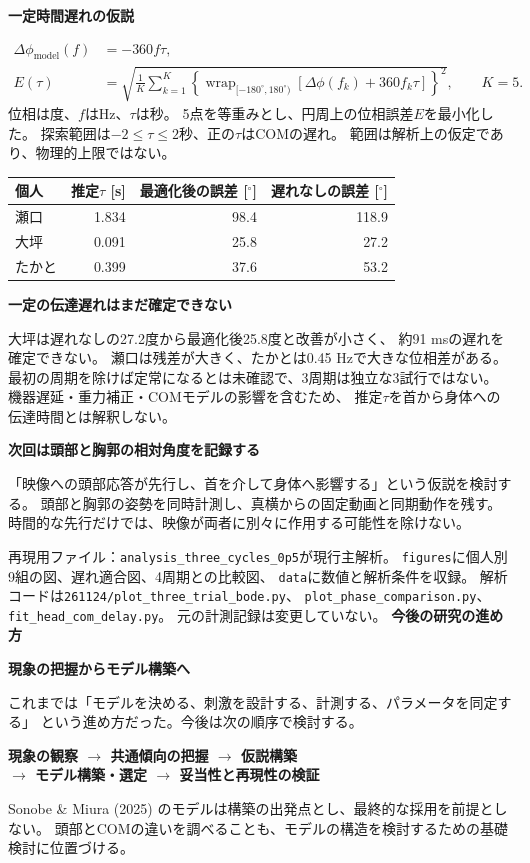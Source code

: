 \documentclass[a4paper,10pt]{ltjsarticle}
\newcommand{\wrap}{\operatorname{wrap}_{[-180^\circ,180^\circ)}}
\newcommand{\sect}[1]{\vspace{4pt}\textbf{\large #1}\par}
\begin{document}
\sect{一定時間遅れの仮説}
\begin{align}
 \Delta\phi_{\mathrm{model}}(f)&=-360f\tau,\\
 E(\tau)&=\sqrt{\frac1K\sum_{k=1}^{K}
 \left\{\wrap\!\left[\Delta\phi(f_k)+360f_k\tau\right]\right\}^{2}},
 \qquad K=5.
\end{align}
位相は度、\(f\)はHz、\(\tau\)は秒。
5点を等重みとし、円周上の位相誤差\(E\)を最小化した。
探索範囲は\(-2\leq\tau\leq2\)秒、正の\(\tau\)はCOMの遅れ。
範囲は解析上の仮定であり、物理的上限ではない。

\begin{center}
\renewcommand{\arraystretch}{1.35}
\begin{tabular}{lrrr}
\toprule
個人 & 推定\(\tau\) [s] & 最適化後の誤差 [$^\circ$] & 遅れなしの誤差 [$^\circ$]\\
\midrule
瀬口 & 1.834 & 98.4 & 118.9\\
大坪 & 0.091 & 25.8 & 27.2\\
たかと & 0.399 & 37.6 & 53.2\\
\bottomrule
\end{tabular}
\end{center}

\sect{一定の伝達遅れはまだ確定できない}
大坪は遅れなしの27.2度から最適化後25.8度と改善が小さく、
約91 msの遅れを確定できない。
瀬口は残差が大きく、たかとは0.45 Hzで大きな位相差がある。
最初の周期を除けば定常になるとは未確認で、3周期は独立な3試行ではない。
機器遅延・重力補正・COMモデルの影響を含むため、
推定\(\tau\)を首から身体への伝達時間とは解釈しない。

\sect{次回は頭部と胸郭の相対角度を記録する}
「映像への頭部応答が先行し、首を介して身体へ影響する」という仮説を検討する。
頭部と胸郭の姿勢を同時計測し、真横からの固定動画と同期動作を残す。
時間的な先行だけでは、映像が両者に別々に作用する可能性を除けない。

\vspace{6pt}
{\footnotesize
再現用ファイル：\texttt{analysis\_three\_cycles\_0p5}が現行主解析。
\texttt{figures}に個人別9組の図、遅れ適合図、4周期との比較図、
\texttt{data}に数値と解析条件を収録。
解析コードは\texttt{261124/plot\_three\_trial\_bode.py}、
\texttt{plot\_phase\_comparison.py}、\texttt{fit\_head\_com\_delay.py}。
元の計測記録は変更していない。}
\newpage
{\LARGE\bfseries 今後の研究の進め方}\par
\sect{現象の把握からモデル構築へ}
これまでは「モデルを決める、刺激を設計する、計測する、パラメータを同定する」
という進め方だった。今後は次の順序で検討する。
\begin{center}
\textbf{現象の観察 $\longrightarrow$ 共通傾向の把握 $\longrightarrow$ 仮説構築}\\[4pt]
\textbf{$\longrightarrow$ モデル構築・選定 $\longrightarrow$ 妥当性と再現性の検証}
\end{center}
Sonobe \& Miura (2025) のモデルは構築の出発点とし、最終的な採用を前提としない。
頭部とCOMの違いを調べることも、モデルの構造を検討するための基礎検討に位置づける。
\end{document}
